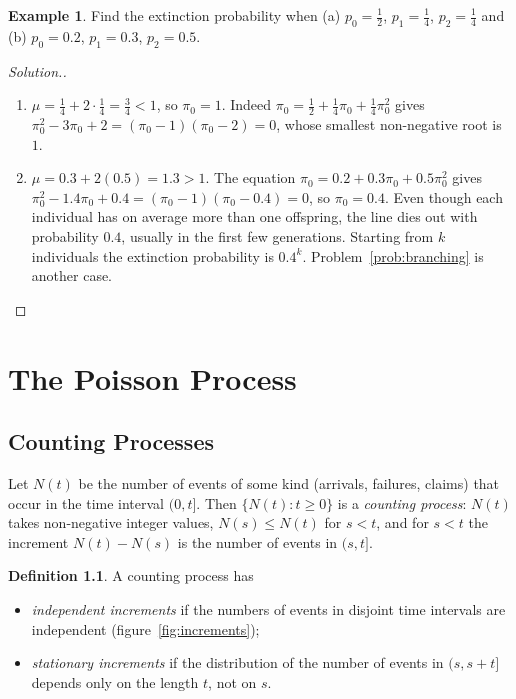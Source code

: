 \documentclass[12pt,a4paper]{report}
\theoremstyle{definition}
\newtheorem{defn}[thm]{Definition}
\newtheorem{exa}[thm]{Example}
\newenvironment{solution}
  {\renewcommand{\qedsymbol}{}\begin{proof}[\textit{Solution}.]}
  {\end{proof}}
\begin{document}
\begin{exa}
\label{ex:extinction}
Find the extinction probability when (a) $p_0 = \frac12$, $p_1 = \frac14$, $p_2 = \frac14$ and
(b) $p_0 = 0.2$, $p_1 = 0.3$, $p_2 = 0.5$.
\end{exa}

\begin{solution}
\begin{enumerate}
\item[(a)] $\mu = \frac14 + 2\cdot\frac14 = \frac34<1$, so $\pi_0 = 1$. Indeed
$\pi_0 = \frac12 + \frac14\pi_0 + \frac14\pi_0^2$ gives $\pi_0^2 - 3\pi_0 + 2 = (\pi_0 - 1)(\pi_0 - 2) = 0$,
whose smallest non-negative root is $1$.
\item[(b)] $\mu = 0.3 + 2(0.5) = 1.3>1$. The equation $\pi_0 = 0.2 + 0.3\pi_0 + 0.5\pi_0^2$ gives
$\pi_0^2 - 1.4\pi_0 + 0.4 = (\pi_0 - 1)(\pi_0 - 0.4) = 0$, so $\pi_0 = 0.4$. Even though each individual
has on average more than one offspring, the line dies out with probability $0.4$, usually in the
first few generations. Starting from $k$ individuals the extinction probability is $0.4^k$.
Problem~\ref{prob:branching} is another case.
\end{enumerate}
\end{solution}

\chapter{The Poisson Process}
\label{ch:continuoustime}

\section{Counting Processes}

Let $N(t)$ be the number of events of some kind (arrivals, failures, claims) that occur in the
time interval $(0, t]$. Then $\{N(t) : t\geq 0\}$ is a \emph{counting process}: $N(t)$ takes
non-negative integer values, $N(s)\leq N(t)$ for $s<t$, and for $s<t$ the increment $N(t) - N(s)$
is the number of events in $(s, t]$.

\begin{defn}
\label{def:increments}
A counting process has
\begin{itemize}
\item \emph{independent increments} if the numbers of events in disjoint time intervals are
independent (figure~\ref{fig:increments});
\item \emph{stationary increments} if the distribution of the number of events in
$(s, s + t]$ depends only on the length $t$, not on $s$.
\end{itemize}
\end{defn}
\end{document}

